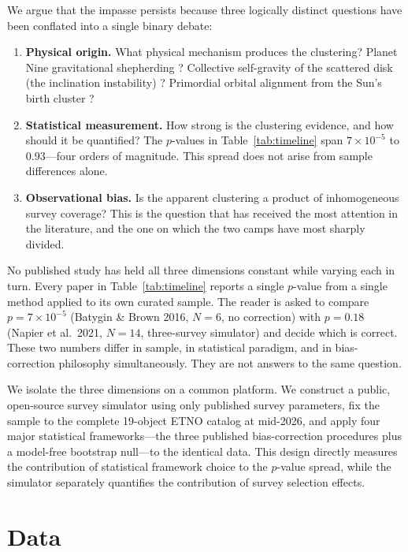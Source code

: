 \documentclass[12pt,a4paper]{article}
\begin{document}
We argue that the impasse persists because three logically distinct questions have been conflated into a single binary debate:

\begin{enumerate}
    \item \textbf{Physical origin.} What physical mechanism produces the clustering? Planet Nine gravitational shepherding \cite{batygin2016,brown2019}? Collective self-gravity of the scattered disk (the inclination instability) \cite{madigan2018,zderic2020}? Primordial orbital alignment from the Sun's birth cluster \cite{trujillo2014}?
    \item \textbf{Statistical measurement.} How strong is the clustering evidence, and how should it be quantified? The $p$-values in Table~\ref{tab:timeline} span $7\times10^{-5}$ to 0.93---four orders of magnitude. This spread does not arise from sample differences alone.
    \item \textbf{Observational bias.} Is the apparent clustering a product of inhomogeneous survey coverage? This is the question that has received the most attention in the literature, and the one on which the two camps have most sharply divided.
\end{enumerate}

No published study has held all three dimensions constant while varying each in turn. Every paper in Table~\ref{tab:timeline} reports a single $p$-value from a single method applied to its own curated sample. The reader is asked to compare $p=7\times10^{-5}$ (Batygin \& Brown 2016, $N=6$, no correction) with $p=0.18$ (Napier et al.\ 2021, $N=14$, three-survey simulator) and decide which is correct. These two numbers differ in sample, in statistical paradigm, and in bias-correction philosophy simultaneously. They are not answers to the same question.

We isolate the three dimensions on a common platform. We construct a public, open-source survey simulator using only published survey parameters, fix the sample to the complete 19-object ETNO catalog at mid-2026, and apply four major statistical frameworks---the three published bias-correction procedures plus a model-free bootstrap null---to the identical data. This design directly measures the contribution of statistical framework choice to the $p$-value spread, while the simulator separately quantifies the contribution of survey selection effects.

\section{Data}
\end{document}
